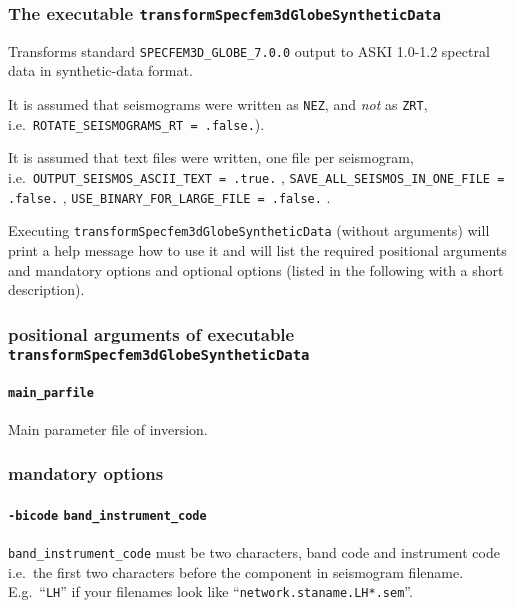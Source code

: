 \documentclass[12pt,a4paper]{article}
\newcommand{\lcode}[1]{\nolinkurl{#1}}
\newcommand{\ASKI}{ {\ttfamily ASKI} }
\begin{document}
\subsubsection*{The executable \lcode{transformSpecfem3dGlobeSyntheticData}}
Transforms standard \lcode{SPECFEM3D_GLOBE_7.0.0} output to \ASKI{} 1.0-1.2 spectral data in synthetic-data 
format.

It is assumed that seismograms were written as \lcode{NEZ}, and \emph{not} as \lcode{ZRT},
i.e.\ \lcode{ROTATE_SEISMOGRAMS_RT = .false.}). 

It is assumed that text files were written, one file per seismogram, 
i.e.\ \lcode{OUTPUT_SEISMOS_ASCII_TEXT = .true.} , \lcode{SAVE_ALL_SEISMOS_IN_ONE_FILE = .false.} , 
\lcode{USE_BINARY_FOR_LARGE_FILE = .false.} .

Executing 
\lcode{transformSpecfem3dGlobeSyntheticData} (without arguments) will print a
help message how to use it and will list the required positional arguments and mandatory
options and optional options (listed in the following with a short description).

\subsubsection*{positional arguments of executable \lcode{transformSpecfem3dGlobeSyntheticData}}
\paragraph{\lcode{main_parfile}}
Main parameter file of inversion.
\subsubsection*{mandatory options}
\paragraph{\lcode{-bicode} \lcode{band_instrument_code}}
\lcode{band_instrument_code} must be two characters, band code and instrument code
i.e.\ the first two characters before the component in seismogram filename.
E.g.\ ``\lcode{LH}'' if your filenames look like ``\lcode{network.staname.LH*.sem}''.
\end{document}
